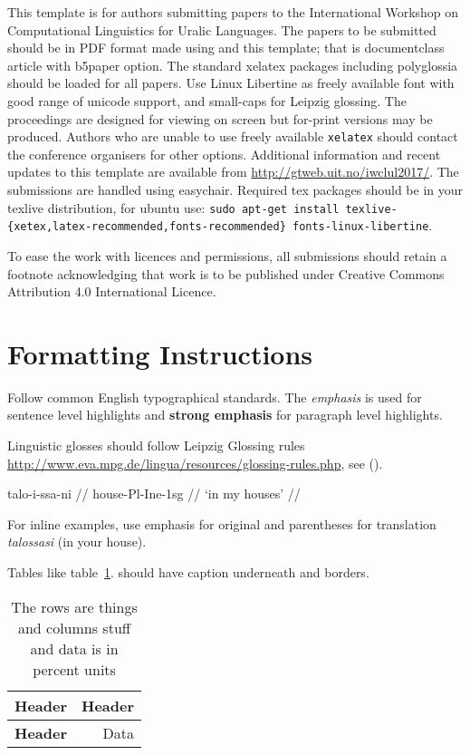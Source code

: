 \documentclass[11pt,a4paper,notitlepage]{article}
\begin{document}
This template is for authors submitting papers to the International Workshop
on Computational Linguistics for Uralic Languages. The papers to be submitted
should be in PDF format made using \XeLaTeX{} and this template; that is
documentclass article with b5paper option. The standard xelatex packages
including polyglossia should be loaded for all papers.  Use Linux Libertine as
freely available font with good range of unicode support, and small-caps for
Leipzig glossing. The proceedings are designed for viewing on screen but
for-print versions may be produced.  Authors who are unable to use freely
available \texttt{xelatex} should contact the conference organisers for other
options. Additional information and recent updates to this template are
available from \url{http://gtweb.uit.no/iwclul2017/}. The submissions are
handled using easychair. Required tex packages should be in your texlive
distribution, for ubuntu use: \texttt{sudo apt-get install
texlive-\{xetex,latex-recommended,fonts-recommended\} fonts-linux-libertine}.

To ease the work with licences and permissions, all submissions should retain
a footnote acknowledging that work is to be published under Creative
Commons Attribution 4.0 International Licence.

\section{Formatting Instructions}

Follow common English typographical standards. The \emph{emphasis} is used for
sentence level highlights and \textbf{strong emphasis} for paragraph level
highlights.

Linguistic glosses should follow Leipzig Glossing rules
\url{http://www.eva.mpg.de/lingua/resources/glossing-rules.php}, see (\nextx).

\ex
\begingl
\gla talo-i-ssa-ni //
\glb house-{\sc Pl}-{\sc Ine}-{\sc 1sg} //
\glft `in my houses' //
\endgl
\xe

For inline examples, use emphasis for original and parentheses for translation
\emph{talossasi} (in your house).

Tables like table~\ref{table:example}. should have caption underneath and
borders.

\begin{table}
    \center
    \begin{tabular}{|l|r|}
        \hline
        \bf Header & \bf Header \\
        \hline
        \bf Header & Data \\
        \hline
    \end{tabular}
    \caption{The rows are things and columns stuff and data is in percent units
    \label{table:example}}
\end{table}
\end{document}
